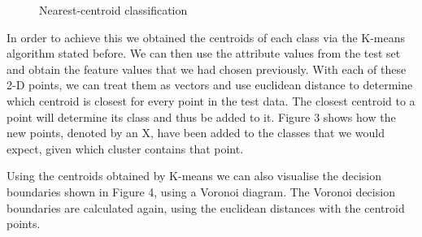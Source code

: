\documentclass[a4paper, 11pt]{article}
\begin{document}
\captionsetup[subfigure]{labelformat=empty}
\begin{figure}[h!]
    \centering
    \qquad
    \caption{Nearest-centroid classification}%
\end{figure}


In order to achieve this we obtained the centroids of each class via the K-means algorithm stated before. We can then use the attribute values from the test set and obtain the feature values that we had chosen previously. With each of these 2-D points, we can treat them as vectors and use euclidean distance to determine which centroid is closest for every point in the test data. The closest centroid to a point will determine its class and thus be added to it. Figure 3 shows how the new points, denoted by an X, have been added to the classes that we would expect, given which cluster contains that point.

Using the centroids obtained by K-means we can also visualise the decision boundaries shown in Figure 4, using a Voronoi diagram. The Voronoi decision boundaries are calculated again, using the euclidean distances with the centroid points.
\end{document}
